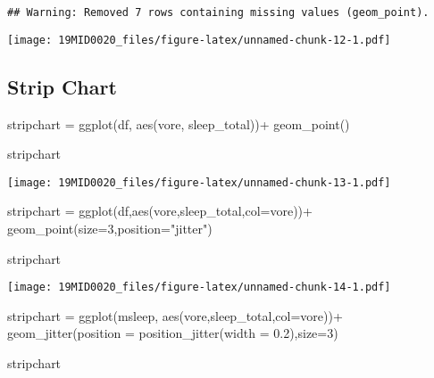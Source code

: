\documentclass[
]{article}
\newenvironment{Shaded}{\begin{snugshade}}{\end{snugshade}}
\newcommand{\AttributeTok}[1]{\textcolor[rgb]{0.77,0.63,0.00}{#1}}
\newcommand{\DecValTok}[1]{\textcolor[rgb]{0.00,0.00,0.81}{#1}}
\newcommand{\FloatTok}[1]{\textcolor[rgb]{0.00,0.00,0.81}{#1}}
\newcommand{\FunctionTok}[1]{\textcolor[rgb]{0.00,0.00,0.00}{#1}}
\newcommand{\NormalTok}[1]{#1}
\newcommand{\OtherTok}[1]{\textcolor[rgb]{0.56,0.35,0.01}{#1}}
\newcommand{\SpecialCharTok}[1]{\textcolor[rgb]{0.00,0.00,0.00}{#1}}
\newcommand{\StringTok}[1]{\textcolor[rgb]{0.31,0.60,0.02}{#1}}
\begin{document}
\begin{verbatim}
## Warning: Removed 7 rows containing missing values (geom_point).
\end{verbatim}

\texttt{[image: 19MID0020\_files/figure-latex/unnamed-chunk-12-1.pdf]}

\hypertarget{strip-chart}{%
\subsection{Strip Chart}\label{strip-chart}}

\begin{Shaded}
\begin{Highlighting}[]
\NormalTok{stripchart }\OtherTok{=} \FunctionTok{ggplot}\NormalTok{(df, }\FunctionTok{aes}\NormalTok{(vore, sleep\_total))}\SpecialCharTok{+}
             \FunctionTok{geom\_point}\NormalTok{()}

\NormalTok{stripchart}
\end{Highlighting}
\end{Shaded}

\texttt{[image: 19MID0020\_files/figure-latex/unnamed-chunk-13-1.pdf]}

\begin{Shaded}
\begin{Highlighting}[]
\NormalTok{stripchart }\OtherTok{=} \FunctionTok{ggplot}\NormalTok{(df,}\FunctionTok{aes}\NormalTok{(vore,sleep\_total,}\AttributeTok{col=}\NormalTok{vore))}\SpecialCharTok{+} 
             \FunctionTok{geom\_point}\NormalTok{(}\AttributeTok{size=}\DecValTok{3}\NormalTok{,}\AttributeTok{position=}\StringTok{"jitter"}\NormalTok{)}

\NormalTok{stripchart}
\end{Highlighting}
\end{Shaded}

\texttt{[image: 19MID0020\_files/figure-latex/unnamed-chunk-14-1.pdf]}

\begin{Shaded}
\begin{Highlighting}[]
\NormalTok{stripchart }\OtherTok{=} \FunctionTok{ggplot}\NormalTok{(msleep, }\FunctionTok{aes}\NormalTok{(vore,sleep\_total,}\AttributeTok{col=}\NormalTok{vore))}\SpecialCharTok{+} 
             \FunctionTok{geom\_jitter}\NormalTok{(}\AttributeTok{position =} \FunctionTok{position\_jitter}\NormalTok{(}\AttributeTok{width =} \FloatTok{0.2}\NormalTok{),}\AttributeTok{size=}\DecValTok{3}\NormalTok{)}

\NormalTok{stripchart}
\end{Highlighting}
\end{Shaded}
\end{document}
